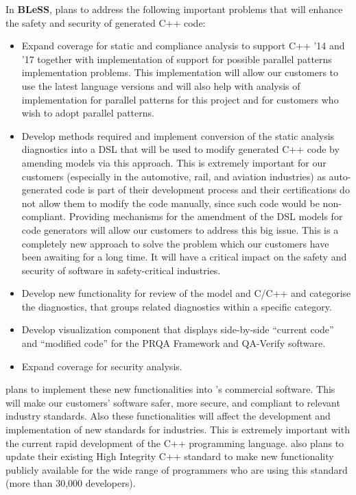 \documentclass[a4paper,11pt]{article}
\newcommand{\project}[1]{\textbf{#1}\xspace}
\newcommand{\BLESS}{\project{BLeSS}}
\newcommand{\TheProject}{\BLESS}
\begin{document}
In \TheProject, \PRshort{} plans to address the following important problems that will enhance the safety and security of generated C++ code:
\begin{itemize}
\item Expand coverage for static and compliance analysis to support C++ '14 and '17 together with implementation of support for possible parallel patterns implementation problems. This implementation will allow our customers to use the latest language versions and will also help with analysis of implementation for parallel patterns for this project and for customers who wish to adopt parallel patterns.

\item Develop methods required and implement conversion of the static analysis diagnostics into a DSL that will be used to modify generated C++ code by amending models via this approach. This is extremely important for our customers (especially in the automotive, rail, and aviation industries) as auto-generated code is part of their development process and their certifications do  not allow them to modify the code manually,
since such code would be non-compliant. Providing mechanisms for the amendment of the DSL models for code generators will allow our customers to address this big issue. This is a completely new approach to solve the problem which our customers have been awaiting for a long time. It will have a critical impact on the safety and security of software in safety-critical industries.

\item Develop new functionality for review of the model and C/C++ and categorise the diagnostics, that groups related diagnostics within a specific category.

\item Develop visualization component that displays side-by-side ``current code'' and ``modified code'' for the PRQA Framework and QA-Verify software.

\item Expand \PRshort{} coverage for security analysis.
\end{itemize}

\PRshort{} plans to implement these new functionalities into
\PRshort{}'s commercial software.  This will make our customers' software
safer, more secure, and compliant to relevant industry standards. Also
these functionalities will affect the development and implementation of
new standards for industries. This is extremely important with the
current rapid development of the C++ programming language. \PRshort{} also
plans to update their existing High Integrity C++ standard to make new
functionality publicly available for the wide range of programmers who
are using this standard (more than 30,000 developers).
\end{document}
